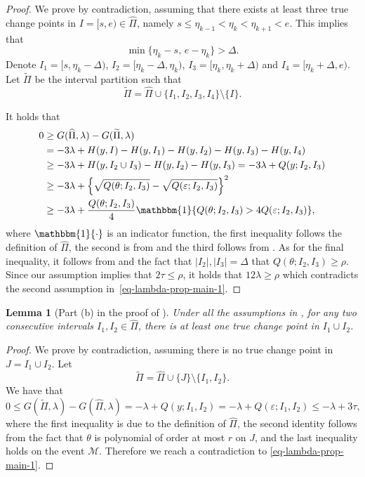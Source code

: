 \documentclass{article}
\newtheorem{lemma}[theorem]{Lemma}
\begin{document}
\begin{proof}
We prove by contradiction, assuming that there exists at least three true change points in $I = [s, e) \in \widehat{\Pi}$, namely $s \leq \eta_{k - 1} < \eta_k < \eta_{k + 1} < e$.  This implies that
	\[
		\min\{\eta_k - s, \, e - \eta_k\} > \Delta.
	\]
	Denote $I_1 = [s, \eta_k - \Delta)$, $I_2 = [\eta_k - \Delta, \eta_k)$, $I_3 = [\eta_k, \eta_k + \Delta)$ and $I_4 = [\eta_k + \Delta, e)$.  Let $\widetilde{\Pi}$ be the interval partition such that 
	\[
		\widetilde{\Pi} = \widehat{\Pi} \cup \{I_1, I_2, I_3, I_4\} \setminus \{I\}.
	\]	

It holds that	
	\begin{align*}
		0 & \geq G(\widehat{\Pi}, \lambda) - 	G(\widetilde{\Pi}, \lambda) \\
		& = -3\lambda + H(y, I) - H(y, I_1) - H(y, I_2) - H(y, I_3) - H(y, I_4) \\
		& \geq -3 \lambda + H(y, I_2 \cup I_3) - H(y, I_2) - H(y, I_3) = -3 \lambda + Q(y; I_2,I_3) \\
		& \geq -3\lambda + \left\{\sqrt{Q(\theta; I_2, I_3)} - \sqrt{Q(\varepsilon; I_2,I_3)}\right\}^2 \\
		& \geq -3\lambda + \frac{Q(\theta; I_2, I_3)}{4} \mathbbm{1}\{Q(\theta; I_2, I_3) > 4 Q(\varepsilon; I_2, I_3)\},
	\end{align*}
	where $\mathbbm{1}\{\cdot\}$ is an indicator function, the first inequality follows the definition of $\widehat{\Pi}$, the second is from  and the third follows from .  As for the final inequality, it follows from  and the fact that $|I_2|, |I_3| = \Delta$ that $Q(\theta; I_2, I_3) \geq \rho$.  Since our assumption implies that $2 \tau \leq \rho$, it holds that $12 \lambda \geq \rho$ which contradicts the second assumption in~\eqref{eq-lambda-prop-main-1}. 
\end{proof}

\begin{lemma}[Part (b) in the proof of ] \label{lem-partd}
Under all the assumptions in , for any two consecutive intervals $I_1, I_2  \in \widehat{\Pi}$, there is at least one true change point in $I_1 \cup I_2$. 
\end{lemma}

\begin{proof}
We prove by contradiction, assuming there is no true change point in $J = I_1 \cup I_2$.  Let
	\[
		\widetilde{\Pi} = \widehat{\Pi} \cup \{J\} \setminus \{I_1, I_2\}.
	\]
	We have that
	\[
		0 \leq G(\widetilde{\Pi}, \lambda) - G(\widehat{\Pi}, \lambda) = -\lambda + Q(y; I_1,I_2) = -\lambda + Q(\varepsilon; I_1, I_2) \leq -\lambda + 3\tau,
	\]
	where the first inequality is due to the definition of $\widehat{\Pi}$, the second identity follows from the fact that $\theta$ is polynomial of order at most $r$ on $J$, and the last inequality holds on the event $\mathcal{M}$.  Therefore we reach a contradiction to \eqref{eq-lambda-prop-main-1}.
\end{proof}
\end{document}
